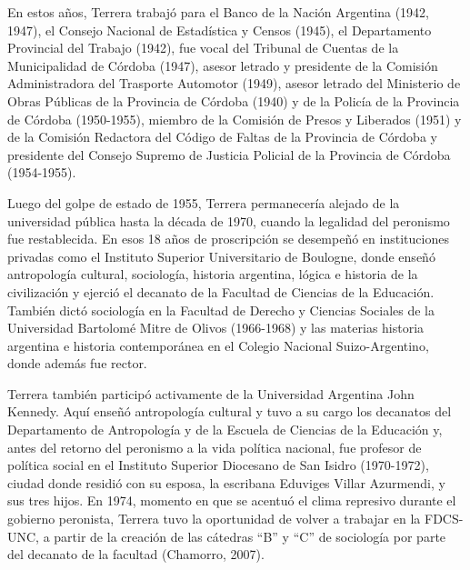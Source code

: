 En estos años, Terrera trabajó para el Banco de la Nación Argentina (1942, 1947), el Consejo Nacional de Estadística y Censos (1945), el Departamento Provincial del Trabajo (1942), fue vocal del Tribunal de Cuentas de la Municipalidad de Córdoba (1947), asesor letrado y presidente de la Comisión Administradora del Trasporte Automotor (1949), asesor letrado del Ministerio de Obras Públicas de la Provincia de Córdoba (1940) y de la Policía de la Provincia de Córdoba (1950-1955), miembro de la Comisión de Presos y Liberados (1951) y de la Comisión Redactora del Código de Faltas de la Provincia de Córdoba y presidente del Consejo Supremo de Justicia Policial de la Provincia de Córdoba (1954-1955).

Luego del golpe de estado de 1955, Terrera permanecería alejado de la universidad pública hasta la década de 1970, cuando la legalidad del peronismo fue restablecida. En esos 18 años de proscripción se desempeñó en instituciones privadas como el Instituto Superior Universitario de Boulogne, donde enseñó antropología cultural, sociología, historia argentina, lógica e historia de la civilización y ejerció el decanato de la Facultad de Ciencias de la Educación. También dictó sociología en la Facultad de Derecho y Ciencias Sociales de la Universidad Bartolomé Mitre de Olivos (1966-1968) y las materias historia argentina e historia contemporánea en el Colegio Nacional Suizo-Argentino, donde además fue rector.

Terrera también participó activamente de la Universidad Argentina John Kennedy. Aquí enseñó antropología cultural y tuvo a su cargo los decanatos del Departamento de Antropología y de la Escuela de Ciencias de la Educación y, antes del retorno del peronismo a la vida política nacional, fue profesor de política social en el Instituto Superior Diocesano de San Isidro (1970-1972), ciudad donde residió con su esposa, la escribana Eduviges Villar Azurmendi, y sus tres hijos. En 1974, momento en que se acentuó el clima represivo durante el gobierno peronista, Terrera tuvo la oportunidad de volver a trabajar en la FDCS-UNC, a partir de la creación de las cátedras ``B'' y ``C'' de sociología por parte del decanato de la facultad (Chamorro, 2007).

